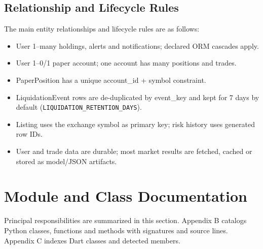 \subsection{Relationship and Lifecycle Rules}
The main entity relationships and lifecycle rules are as follows:
\begin{itemize}
\item User 1--many holdings, alerts and notifications; declared ORM cascades apply.
\item User 1--0/1 paper account; one account has many positions and trades.
\item PaperPosition has a unique account\_id + symbol constraint.
\item LiquidationEvent rows are de-duplicated by event\_key and kept for 7 days by default (\texttt{LIQUIDATION\_RETENTION\_DAYS}).
\item Listing uses the exchange symbol as primary key; risk history uses generated row IDs.
\item User and trade data are durable; most market results are fetched, cached or stored as model/JSON artifacts.
\end{itemize}

\section{Module and Class Documentation}
Principal responsibilities are summarized in this section. Appendix B catalogs Python classes, functions and methods with signatures and source lines. Appendix C indexes Dart classes and detected members.

